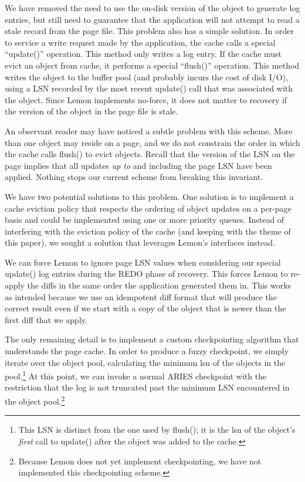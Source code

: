 \documentclass[letterpaper,twocolumn,english]{article}
\newcommand{\yad}{Lemon\xspace}
\begin{document}
We have removed the need to use the on-disk version of the object to
generate log entries, but still need to guarantee that the application
will not attempt to read a stale record from the page file.  This
problem also has a simple solution.  In order to service a write
request made by the application, the cache calls a special
``update()'' operation.  This method only writes a log entry.  If the
cache must evict an object from cache, it performs a special ``flush()''
operation.  This method writes the object to the buffer pool (and
probably incurs the cost of disk I/O), using a LSN recorded by the
most recent update() call that was associated with the object.  Since
\yad implements no-force, it does not matter to recovery if the
version of the object in the page file is stale.

An observant reader may have noticed a subtle problem with this
scheme.  More than one object may reside on a page, and we do not
constrain the order in which the cache calls flush() to evict objects.
Recall that the version of the LSN on the page implies that all
updates {\em up to} and including the page LSN have been applied.
Nothing stops our current scheme from breaking this invariant.  

We have two potential solutions to this problem.  One solution is to
implement a cache eviction policy that respects the ordering of object
updates on a per-page basis and could be implemented using one or
more priority queues.  Instead of interfering with the eviction policy
of the cache (and keeping with the theme of this paper), we sought a
solution that leverages \yad's interfaces instead.

We can force \yad to ignore page LSN values when considering our
special update() log entries during the REDO phase of recovery.  This
forces \yad to re-apply the diffs in the same order the application
generated them in.  This works as intended because we use an
idempotent diff format that will produce the correct result even if we
start with a copy of the object that is newer than the first diff that
we apply.

The only remaining detail is to implement a custom checkpointing
algorithm that understands the page cache.  In order to produce a
fuzzy checkpoint, we simply iterate over the object pool, calculating
the minimum lsn of the objects in the pool.\footnote{This LSN is distinct from
the one used by flush(); it is the lsn of the object's {\em first}
call to update() after the object was added to the cache.}  At this
point, we can invoke a normal ARIES checkpoint with the restriction
that the log is not truncated past the minimum LSN encountered in the
object pool.\footnote{Because \yad does not yet implement
checkpointing, we have not implemented this checkpointing scheme.}
\end{document}

